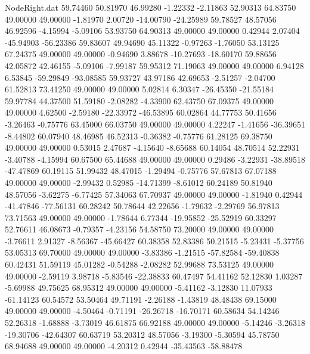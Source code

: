 \begin{filecontents}{NodeRight.dat}
  59.74460   50.81970   46.99280    -1.22332   -2.11863   52.90313   64.83750   49.00000   49.00000   -1.81970    2.00720  -14.00790  -24.25989
  59.78527   48.57056   46.92596    -4.15994   -5.09106   53.93750   64.90313   49.00000   49.00000    0.42944    2.07404  -45.94903  -56.23386
  59.83607   49.94690   45.11322    -0.97263   -1.76050   53.13125   67.24375   49.00000   49.00000   -0.94690    3.88678  -10.27693  -18.60170
  59.88656   42.05872   42.46155    -5.09106   -7.99187   59.95312   71.19063   49.00000   49.00000    6.94128    6.53845  -59.29849  -93.08585
  59.93727   43.97186   42.69653    -2.51257   -2.04700   61.52813   73.41250   49.00000   49.00000    5.02814    6.30347  -26.45350  -21.55184
  59.97784   44.37500   51.59180    -2.08282   -4.33900   62.43750   67.09375   49.00000   49.00000    4.62500   -2.59180  -22.33972  -46.53895
  60.02864   44.77753   50.41656    -3.26463   -0.75776   63.45000   66.03750   49.00000   49.00000    4.22247   -1.41656  -36.39651   -8.44802
  60.07940   48.46985   46.52313    -0.36382   -0.75776   61.28125   69.38750   49.00000   49.00000    0.53015    2.47687   -4.15640   -8.65688
  60.14054   48.70514   52.22931    -3.40788   -4.15994   60.67500   65.44688   49.00000   49.00000    0.29486   -3.22931  -38.89518  -47.47869
  60.19115   51.99432   48.47015    -1.29494   -0.75776   57.67813   67.07188   49.00000   49.00000   -2.99432    0.52985  -14.71399   -8.61012
  60.24189   50.81940   48.57056    -3.62275   -6.77425   57.34063   67.70937   49.00000   49.00000   -1.81940    0.42944  -41.47846  -77.56131
  60.28242   50.78644   42.22656    -1.79632   -2.29769   56.97813   73.71563   49.00000   49.00000   -1.78644    6.77344  -19.95852  -25.52919
  60.33297   52.76611   46.08673    -0.79357   -4.23156   54.58750   73.20000   49.00000   49.00000   -3.76611    2.91327   -8.56367  -45.66427
  60.38358   52.83386   50.21515    -5.23431   -5.37756   53.05313   69.70000   49.00000   49.00000   -3.83386   -1.21515  -57.82584  -59.40838
  60.42431   51.59119   45.01282    -0.54288   -2.08282   52.99688   73.53125   49.00000   49.00000   -2.59119    3.98718   -5.83546  -22.38833
  60.47497   54.41162   52.12830     1.03287   -5.69988   49.75625   68.95312   49.00000   49.00000   -5.41162   -3.12830   11.07933  -61.14123
  60.54572   53.50464   49.71191    -2.26188   -1.43819   48.48438   69.15000   49.00000   49.00000   -4.50464   -0.71191  -26.26718  -16.70171
  60.58634   54.14246   52.26318    -1.68888   -3.73019   46.61875   66.92188   49.00000   49.00000   -5.14246   -3.26318  -19.30706  -42.64307
  60.63719   53.20312   48.57056    -3.19300   -5.30594   45.78750   68.94688   49.00000   49.00000   -4.20312    0.42944  -35.43563  -58.88478

\end{filecontents}
